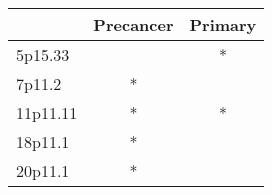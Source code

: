\begin{tabular}{lcc}
\toprule
{} & Precancer & Primary \\
\midrule
5p15.33  &           &       * \\
7p11.2   &         * &         \\
11p11.11 &         * &       * \\
18p11.1  &         * &         \\
20p11.1  &         * &         \\
\bottomrule
\end{tabular}
